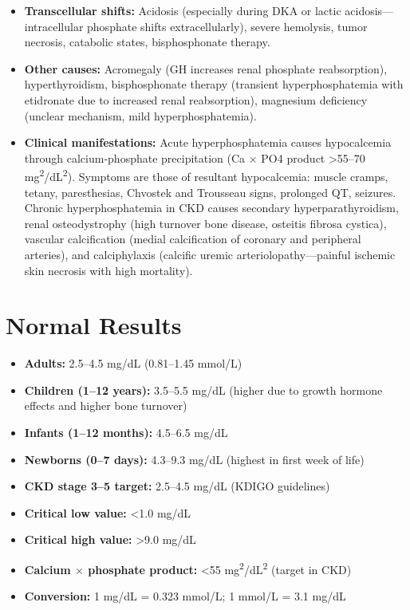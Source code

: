 \begin{itemize}
  \item \textbf{Transcellular shifts:} Acidosis (especially during DKA or lactic acidosis---intracellular phosphate shifts extracellularly), severe hemolysis, tumor necrosis, catabolic states, bisphosphonate therapy.
  \item \textbf{Other causes:} Acromegaly (GH increases renal phosphate reabsorption), hyperthyroidism, bisphosphonate therapy (transient hyperphosphatemia with etidronate due to increased renal reabsorption), magnesium deficiency (unclear mechanism, mild hyperphosphatemia).
  \item \textbf{Clinical manifestations:} Acute hyperphosphatemia causes hypocalcemia through calcium-phosphate precipitation (Ca $\times$ PO4 product >55--70 mg\textsuperscript{2}/dL\textsuperscript{2}). Symptoms are those of resultant hypocalcemia: muscle cramps, tetany, paresthesias, Chvostek and Trousseau signs, prolonged QT, seizures. Chronic hyperphosphatemia in CKD causes secondary hyperparathyroidism, renal osteodystrophy (high turnover bone disease, osteitis fibrosa cystica), vascular calcification (medial calcification of coronary and peripheral arteries), and calciphylaxis (calcific uremic arteriolopathy---painful ischemic skin necrosis with high mortality).
\end{itemize}

\section*{Normal Results}
\begin{itemize}
  \item \textbf{Adults:} 2.5--4.5 mg/dL (0.81--1.45 mmol/L)
  \item \textbf{Children (1--12 years):} 3.5--5.5 mg/dL (higher due to growth hormone effects and higher bone turnover)
  \item \textbf{Infants (1--12 months):} 4.5--6.5 mg/dL
  \item \textbf{Newborns (0--7 days):} 4.3--9.3 mg/dL (highest in first week of life)
  \item \textbf{CKD stage 3--5 target:} 2.5--4.5 mg/dL (KDIGO guidelines)
  \item \textbf{Critical low value:} <1.0 mg/dL
  \item \textbf{Critical high value:} >9.0 mg/dL
  \item \textbf{Calcium $\times$ phosphate product:} <55 mg\textsuperscript{2}/dL\textsuperscript{2} (target in CKD)
  \item \textbf{Conversion:} 1 mg/dL = 0.323 mmol/L; 1 mmol/L = 3.1 mg/dL
\end{itemize}

